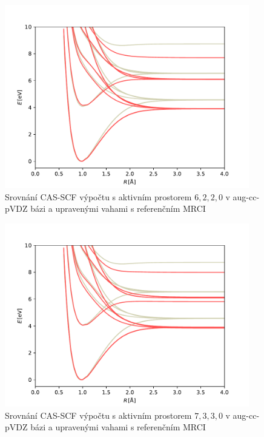 \begin{figure}
\centering
\includegraphics[width=0.95\textwidth]{../img/OH-MULTI-DZ-6220-w8.pdf}
\caption{Srovnání CAS-SCF výpočtu s aktivním prostorem $6,2,2,0$ v aug-cc-pVDZ bázi a upravenými vahami s referenčním MRCI}
\label{gr_OH_6220_w}
\end{figure}

\begin{figure}
\centering
\includegraphics[width=0.95\textwidth]{../img/OH-MULTI-DZ-7330-w1.pdf}
\caption{Srovnání CAS-SCF výpočtu s aktivním prostorem $7,3,3,0$ v aug-cc-pVDZ bázi a upravenými vahami s referenčním MRCI}
\label{gr_OH_7330_w}
\end{figure}

